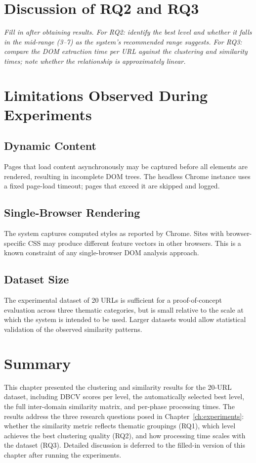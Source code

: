 \section{Discussion of RQ2 and RQ3}

\textit{Fill in after obtaining results. For RQ2: identify the best level and whether it falls in the mid-range (3--7) as the system's recommended range suggests. For RQ3: compare the DOM extraction time per URL against the clustering and similarity times; note whether the relationship is approximately linear.}

\section{Limitations Observed During Experiments}
\label{sec:limitations-discussion}

\subsection{Dynamic Content}

Pages that load content asynchronously may be captured before all elements are rendered, resulting in incomplete DOM trees. The headless Chrome instance uses a fixed page-load timeout; pages that exceed it are skipped and logged.

\subsection{Single-Browser Rendering}

The system captures computed styles as reported by Chrome. Sites with browser-specific CSS may produce different feature vectors in other browsers. This is a known constraint of any single-browser DOM analysis approach.

\subsection{Dataset Size}

The experimental dataset of 20 URLs is sufficient for a proof-of-concept evaluation across three thematic categories, but is small relative to the scale at which the system is intended to be used. Larger datasets would allow statistical validation of the observed similarity patterns.

\section{Summary}
\label{sec:ch6-summary}

This chapter presented the clustering and similarity results for the 20-URL dataset, including DBCV scores per level, the automatically selected best level, the full inter-domain similarity matrix, and per-phase processing times. The results address the three research questions posed in Chapter~\ref{ch:experiments}: whether the similarity metric reflects thematic groupings (RQ1), which level achieves the best clustering quality (RQ2), and how processing time scales with the dataset (RQ3). Detailed discussion is deferred to the filled-in version of this chapter after running the experiments.
